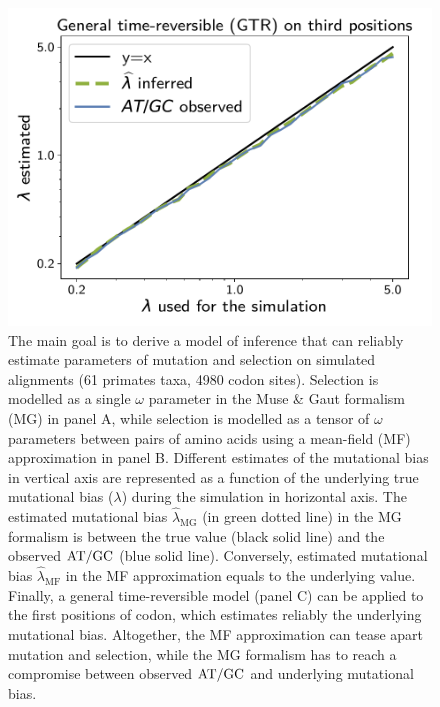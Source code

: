 \documentclass{article}
\begin{document}
\begin{figure}[!htb]
\begin{minipage}{0.325\linewidth}
 \end{minipage}
 \hfill
 \begin{minipage}{0.325\linewidth}
 	\includegraphics[width=\linewidth, page=1]{inference_simulations/lambda_GTR}
 \end{minipage}
 \hfill
 \caption[Estimation of mutational bias]{
 The main goal is to derive a model of inference that can reliably estimate parameters of mutation and selection on simulated alignments (61 primates taxa, 4980 codon sites).
 Selection is modelled as a single $\omega$ parameter in the Muse \& Gaut formalism ({MG}) in panel A, while selection is modelled as a tensor of $\omega$ parameters between pairs of amino acids using a mean-field ({MF}) approximation in panel B.
 Different estimates of the mutational bias in vertical axis are represented as a function of the underlying true mutational bias ($\lambda$) during the simulation in horizontal axis.
 The estimated mutational bias $\widehat{\lambda}_{\text{{MG}}}$ (in green dotted line) in the {MG} formalism is between the true value (black solid line) and the observed $\text{AT/GC}$ (blue solid line).
 Conversely, estimated mutational bias $\widehat{\lambda}_{\text{{MF}}}$ in the {MF} approximation equals to the underlying value.
 Finally, a general time-reversible model (panel C) can be applied to the first positions of codon, which estimates reliably the underlying mutational bias.
 Altogether, the {MF} approximation can tease apart mutation and selection, while the {MG} formalism has to reach a compromise between observed $\text{AT/GC}$ and underlying mutational bias.
 }
 \label{fig:mut-bias-inference}
\end{figure}
\end{document}
